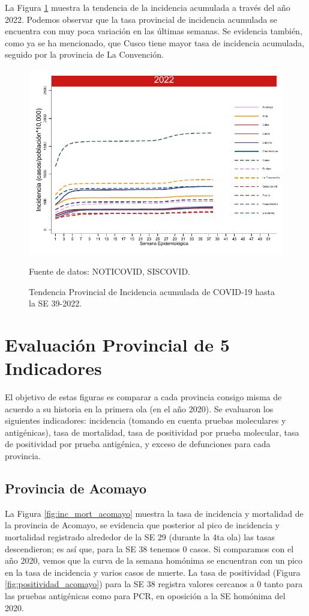 \documentclass[12pt,a4paper,openany]{book}
\begin{document}
	La Figura \ref{fig:incidencia_provincial} muestra la tendencia de la incidencia acumulada a través del año 2022. Podemos observar que la tasa provincial de incidencia acumulada se encuentra con muy poca variación en las últimas semanas. Se evidencia también, como ya se ha mencionado, que Cusco tiene mayor tasa de incidencia acumulada, seguido por la provincia de La Convención.
	
	\begin{figure}[h]
		\caption{Tendencia Provincial de Incidencia acumulada de COVID-19 hasta la SE 39-2022. }\label{fig:incidencia_provincial}
		\begin{center}
			\includegraphics[width=0.60\linewidth]{../figuras/incidencia_provincial_acumulada_2022.pdf}
		\end{center}
		{\footnotesize {Fuente de datos: NOTICOVID, SISCOVID.}}
	\end{figure}
	
	\clearpage
	
	\section*{Evaluación Provincial de 5 Indicadores}
	\noindent El objetivo de estas figuras es comparar a cada provincia consigo misma de acuerdo a su historia  en la primera ola (en el año 2020). Se evaluaron los siguientes indicadores: incidencia (tomando en cuenta pruebas moleculares y antigénicas), tasa de mortalidad, tasa de positividad por prueba molecular, tasa de positividad por prueba antigénica, y exceso de defunciones para cada provincia.
	
	\subsection*{Provincia de Acomayo}
	\noindent La Figura \ref{fig:inc_mort_acomayo} muestra la tasa de incidencia y mortalidad de la provincia de Acomayo, se evidencia que posterior al pico de incidencia y mortalidad registrado alrededor de la SE 29 (durante la 4ta ola) las tasas descendieron; es así que, para la SE 38 tenemos 0 casos. Si comparamos con el año 2020, vemos que la curva de la semana homónima se encuentran con un pico en la tasa de incidencia y varios casos de muerte. La tasa de positividad (Figura \ref{fig:positividad_acomayo}) para la SE 38 registra valores cercanos a 0 tanto para las pruebas antigénicas como para PCR, en oposición a la SE homónima del 2020.
		
\end{document}
